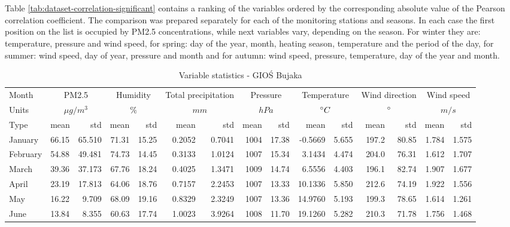 \\\\
Table \ref{tab:dataset-correlation-significant} contains a ranking of the variables ordered by the corresponding absolute value of the Pearson correlation coefficient. The comparison was prepared separately for each of the monitoring stations and seasons. In each case the first position on the list is occupied by PM2.5 concentrations, while next variables vary, depending on the season. For winter they are: temperature, pressure and wind speed, for spring: day of the year, month, heating season, temperature and the period of the day, for summer: wind speed, day of year, pressure and month and for autumn: wind speed, pressure, temperature, day of the year and month.
\begin{landscape}
\begin{table}[H]
\centering
\caption{Variable statistics - GIOŚ Bujaka}
\label{tab:dataset-stats-bujaka}
\footnotesize
\begin{tabular}{llrrrrrrrrrrrrr}
\hline
Month & \multicolumn{2}{c}{PM2.5} & \multicolumn{2}{c}{Humidity} & \multicolumn{2}{c}{Total precipitation} & \multicolumn{2}{c}{Pressure} & \multicolumn{2}{c}{Temperature} & \multicolumn{2}{c}{Wind direction} & \multicolumn{2}{c}{Wind speed} \\
Units & \multicolumn{2}{c}{$\mu g / m^3$} & \multicolumn{2}{c}{$\%$} & \multicolumn{2}{c}{$mm$} & \multicolumn{2}{c}{$hPa$} & \multicolumn{2}{c}{$\degree C$} & \multicolumn{2}{c}{$\degree$} & \multicolumn{2}{c}{$m/s$} \\
Type & mean & std & mean & std & mean & std & mean & std & mean & std & mean & std & mean & std \\ \hline
January & 66.15 & 65.510 & 71.31 & 15.25 & 0.2052 & 0.7041 & 1004 & 17.38 & -0.5669 & 5.655 & 197.2 & 80.85 & 1.784 & 1.575 \\
February & 54.88 & 49.481 & 74.73 & 14.45 & 0.3133 & 1.0124 & 1007 & 15.34 & 3.1434 & 4.474 & 204.0 & 76.31 & 1.612 & 1.707 \\
March & 39.36 & 37.173 & 67.76 & 18.24 & 0.4025 & 1.3471 & 1009 & 14.74 & 6.5556 & 4.403 & 196.1 & 82.74 & 1.907 & 1.677 \\
April & 23.19 & 17.813 & 64.06 & 18.76 & 0.7157 & 2.2453 & 1007 & 13.33 & 10.1336 & 5.850 & 212.6 & 74.19 & 1.922 & 1.556 \\
May & 16.22 & 9.709 & 68.09 & 19.16 & 0.8329 & 2.3249 & 1007 & 13.36 & 14.9760 & 5.193 & 199.3 & 78.65 & 1.614 & 1.261 \\
June & 13.84 & 8.355 & 60.63 & 17.74 & 1.0023 & 3.9264 & 1008 & 11.70 & 19.1260 & 5.282 & 210.3 & 71.78 & 1.756 & 1.468 \\

\end{tabular}
\end{table}
\end{landscape}
